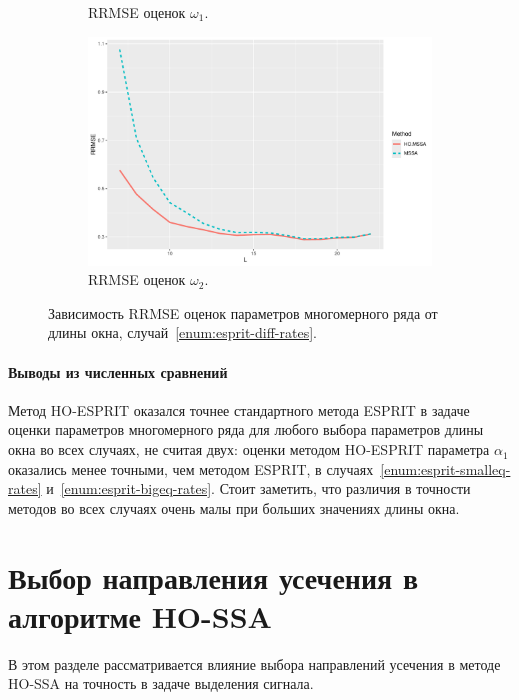 \documentclass[specialist,
  substylefile=spbu_report.rtx,
subf,href,colorlinks=true, 12pt]{disser}
\theoremstyle{plain}
\theoremstyle{definition}
\theoremstyle{remark}
\begin{document}
\begin{figure}[!ht]
\begin{subfigure}{0.49\linewidth}
    \caption{RRMSE оценок $\omega_1$.}
    \label{fig:freq1_L}
  \end{subfigure}
  \begin{subfigure}{0.49\linewidth}
    \includegraphics[width=\linewidth, height=0.167\textheight]{freq2_L.pdf}
    \caption{RRMSE оценок $\omega_2$.}
    \label{fig:freq2_L}
  \end{subfigure}
  \caption{Зависимость RRMSE оценок параметров многомерного ряда от
    длины окна,
  случай~\ref{enum:esprit-diff-rates}.}
  \label{fig:L_diff_rates}
\end{figure}

\paragraph{Выводы из численных сравнений}
Метод HO-ESPRIT оказался точнее стандартного метода ESPRIT в задаче
оценки параметров
многомерного ряда для любого выбора параметров длины окна во всех случаях,
не считая двух: оценки методом HO-ESPRIT параметра $\alpha_1$ оказались
менее точными, чем методом ESPRIT, в случаях~\ref{enum:esprit-smalleq-rates}
и~\ref{enum:esprit-bigeq-rates}.
Стоит заметить, что различия в точности методов во всех случаях очень малы при
больших значениях длины окна.
\clearpage

\section{Выбор направления усечения в алгоритме
HO-SSA}\label{sec:trunc-dim-ho-ssa}
В этом разделе рассматривается влияние выбора направлений усечения
в методе HO-SSA на точность в задаче выделения сигнала.
\end{document}
